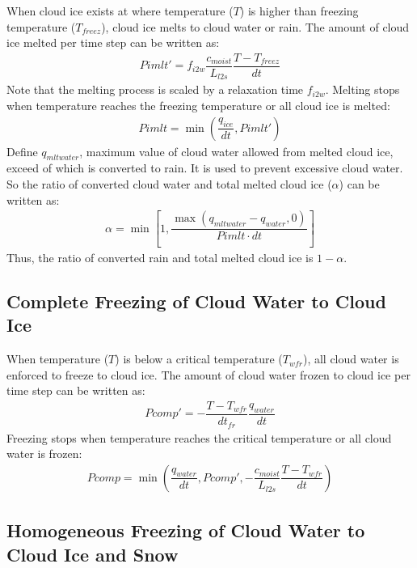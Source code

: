 \documentclass[letterpaper,titlepage,10pt]{article}
\numberwithin{equation}{section}
\begin{document}
When cloud ice exists at where temperature ($T$) is higher than freezing temperature ($T_{freez}$), cloud ice melts to cloud water or rain. The amount of cloud ice melted per time step can be written as:
\begin{gather}
	Pimlt' = f_{i2w} \dfrac{c_{moist}}{L_{l2s}} \dfrac{T - T_{freez}}{dt}
\end{gather}
Note that the melting process is scaled by a relaxation time $f_{i2w}$. Melting stops when temperature reaches the freezing temperature or all cloud ice is melted:
\begin{gather}
	Pimlt = \min \left(\dfrac{q_{ice}}{dt}, Pimlt' \right)
\end{gather}
Define $q_{mltwater}$, maximum value of cloud water allowed from melted cloud ice, exceed of which is converted to rain. It is used to prevent excessive cloud water. So the ratio of converted cloud water and total melted cloud ice ($\alpha$) can be written as:
\begin{gather}
	\alpha = \min \left[1, \dfrac{\max \left(q_{mltwater} - q_{water}, 0 \right)}{Pimlt \cdot dt} \right]
\end{gather}
Thus, the ratio of converted rain and total melted cloud ice is $1 - \alpha$.


\subsection{Complete Freezing of Cloud Water to Cloud Ice}

When temperature ($T$) is below a critical temperature ($T_{wfr}$), all cloud water is enforced to freeze to cloud ice. The amount of cloud water frozen to cloud ice per time step can be written as:
\begin{gather}
	Pcomp' = - \dfrac{T - T_{wfr}}{dt_{fr}} \dfrac{q_{water}}{dt}
\end{gather}
Freezing stops when temperature reaches the critical temperature or all cloud water is frozen:
\begin{gather}
	Pcomp = \min \left(\dfrac{q_{water}}{dt}, Pcomp', - \dfrac{c_{moist}}{L_{l2s}} \dfrac{T - T_{wfr}}{dt} \right)
\end{gather}


\subsection{Homogeneous Freezing of Cloud Water to Cloud Ice and Snow}
\end{document}
